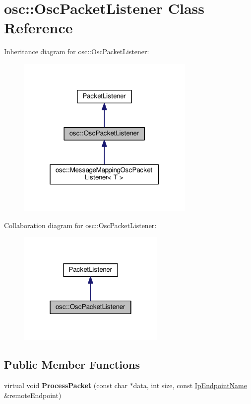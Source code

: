 \hypertarget{classosc_1_1_osc_packet_listener}{}\section{osc\+:\+:Osc\+Packet\+Listener Class Reference}
\label{classosc_1_1_osc_packet_listener}


Inheritance diagram for osc\+:\+:Osc\+Packet\+Listener\+:\nopagebreak
\begin{figure}[H]
\begin{center}
\leavevmode
\includegraphics[width=244pt]{classosc_1_1_osc_packet_listener__inherit__graph}
\end{center}
\end{figure}


Collaboration diagram for osc\+:\+:Osc\+Packet\+Listener\+:\nopagebreak
\begin{figure}[H]
\begin{center}
\leavevmode
\includegraphics[width=202pt]{classosc_1_1_osc_packet_listener__coll__graph}
\end{center}
\end{figure}
\subsection*{Public Member Functions}
\begin{DoxyCompactItemize}
\item 
\mbox{\label{classosc_1_1_osc_packet_listener_ae59097d1dd4e38cc0249bf94d515e1c4}} 
virtual void {\bfseries Process\+Packet} (const char $\ast$data, int size, const \hyperlink{class_ip_endpoint_name}{Ip\+Endpoint\+Name} \&remote\+Endpoint)
\end{DoxyCompactItemize}
